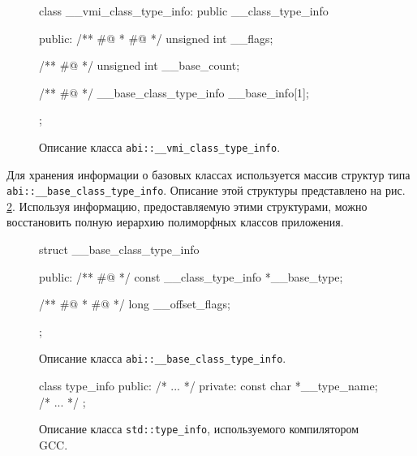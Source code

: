 \begin{figure}[htb!]
\hspace{2cm}
\begin{minipage}[b]{1cm}
\begin{cplusplus}
class __vmi_class_type_info: public __class_type_info {
public:
  /** #@
   * #@ */
  unsigned int __flags;
  
  /** #@ */
  unsigned int __base_count;
  
  /** #@ */
  __base_class_type_info __base_info[1];
};
\end{cplusplus}
\end{minipage}
\caption{Описание класса \lstinline{abi::__vmi_class_type_info}.}
\label{listing:__vmi_class_type_info}
\end{figure}

Для хранения информации о базовых классах используется массив структур типа \lstinline{abi::__base_class_type_info}. Описание этой структуры представлено на рис. \ref{listing:__base_class_type_info}. Используя информацию, предоставляемую этими структурами, можно восстановить полную иерархию полиморфных классов приложения.

\begin{figure}[htb!]
\hspace{2cm}
\begin{minipage}[b]{1cm}
\begin{cplusplus}
struct __base_class_type_info {
public:
  /** #@ */
  const __class_type_info *__base_type;
  
  /** #@
   * #@ */
  long __offset_flags;
};
\end{cplusplus}
\end{minipage}
\caption{Описание класса \lstinline{abi::__base_class_type_info}.}
\label{listing:__base_class_type_info}
\end{figure}

\begin{figure}[htb!]
\hspace{2cm}
\begin{minipage}[b]{1cm}
\begin{cplusplus}
class type_info {
public:
  /* ... */
private:
  const char *__type_name;
  /* ... */
};
\end{cplusplus}
\end{minipage}
\caption{Описание класса \lstinline{std::type_info}, используемого компилятором GCC.}
\label{listing:gcc_type_info}
\end{figure}

